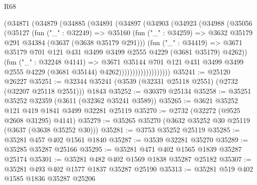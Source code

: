 \begin{lexlean}{R68}
\begin{coremodule}
                    (@34871
                      (@34879
                        (@34885
                          (@34891
                            (@34897
                              (@34903
                                (@34923
                                  (@34988
                                    (@35056
                                      (@35127
                                        (fun ("_" : @32249) =>
                                        @35160
                                          (fun ("_" : @34259) =>
                                          @3632 @35179 @291 @34384 (@3637 (@3638 @35179 @291)))
                                          (fun ("_" : @34419) =>
                                          @3671
                                            @35179
                                            @701
                                            @121
                                            @431
                                            @3499
                                            @3499
                                            @2555
                                            @4229
                                            (@3681 @35179)
                                            @4262))
                                        (fun ("_" : @32248 @4141) =>
                                        @3671
                                          @35144
                                          @701
                                          @121
                                          @431
                                          @3499
                                          @3499
                                          @2555
                                          @4229
                                          (@3681 @35144)
                                          @4262)))))))))))))))))))
@35241 := @25120 @26227
@35251 := @32344 @35241 (@3539 (@32331 @25118 @2551) (@2732 (@32207 @25118 @2551))) @1843
@35252 := @30379 @25134
@35258 := @35251 @35252 @32359 (@3611 (@32362 @35241 @3589))
@35265 := @3621 @35252 @121 @419 @1841 @3499 @32281 @25119
@35270 := @2732 (@32272 (@9525 @2608 @31295) @4141)
@35279 := @35265 @35270 (@3632 @35252 @30 @25119 (@3637 (@3638 @35252 @30)))
@35281 := @3753 @35252 @25119
@35285 := @35281 @457 @402 @1561 @1840
@35287 := @3539 @32281 @35270
@35289 := @35285 @35287 @25166
@35295 := @35281 @471 @402 @1565 @1839 @35287 @25174
@35301 := @35281 @482 @402 @1569 @1838 @35287 @25182
@35307 := @35281 @493 @402 @1577 @1837 @35287 @25190
@35313 := @35281 @519 @402 @1585 @1836 @35287 @25206

\end{coremodule}
\end{lexlean}
